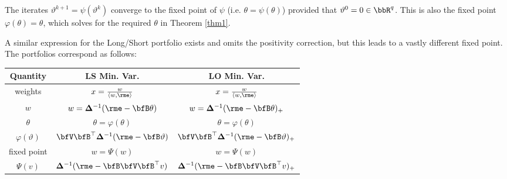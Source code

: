 \documentclass[12pt,leqno,letterpaper]{article}
\begin{document}
\begin{theorem}\label{thm:sol}
The iterates $\vartheta^{k+1}
= \psi(\vartheta^k)$ converge to the fixed point 
of $\psi$ (i.e. $\theta = \psi(\theta)$)
provided that $\vartheta^0 = 0 \in \bbR^q$.  This is also the fixed point $\varphi(\theta) = \theta$, which solves for the required $\theta$ in Theorem \ref{thm1}.
\end{theorem}
A similar expression for the Long/Short portfolio exists and omits the positivity correction, but this leads to a vastly different fixed point.  The portfolios correspond as follows:
\begin{table}
\centering
\renewcommand{\arraystretch}{1.32}
  \begin{tabular}{ccc}
\toprule
  Quantity & 
  LS Min. Var. & LO Min. Var. \\
\midrule
 weights 
 & $x = \frac{w}{\prj{w}{\rme}}$
 & $x = \frac{w}{\prj{w}{\rme}}$ \\
 $w$ 
 & $w = \bdel^{-1} (\rme - \bfB \theta)$ 
 & $w = \bdel^{-1} (\rme - \bfB \theta)_+$ \\
 $\theta$ 
 & $\theta = \varphi(\theta)$
 & $\theta = \varphi(\theta)$ \\
 $\varphi(\vartheta)$ 
 & $\bfV \bfB^\top \bdel^{-1} (\rme - \bfB \vartheta)$ 
 & $\bfV \bfB^\top \bdel^{-1} (\rme - \bfB \vartheta)_+$ \\
 fixed point
 & $w = \Psi(w)$
 & $w = \Psi(w)$ \\
 $\Psi (v)$ 
 & $\bdel^{-1} (\rme - \bfB \bfV \bfB^\top v)$
 & $\bdel^{-1} (\rme - \bfB \bfV \bfB^\top v)_+$
 \\
\bottomrule
\end{tabular}
\end{table}
\end{document}
